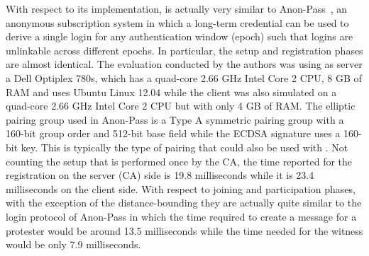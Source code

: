 With respect to its implementation, \CROCUS is actually very similar to Anon-Pass~\cite{AnonPass}, an anonymous subscription system in which a long-term credential can be used to derive a single login for any authentication window (\ie epoch) such that logins are unlinkable across different epochs. 
In particular, the setup and registration phases are almost identical. 
The evaluation conducted by the authors was using as server a Dell Optiplex 780s, which has a quad-core 2.66 GHz Intel Core 2 CPU, 8 GB of RAM and uses Ubuntu Linux 12.04 while the client was also simulated on a quad-core 2.66 GHz Intel Core 2 CPU but with only 4 GB of RAM.
The elliptic pairing group used in Anon-Pass is a Type A symmetric pairing group with a 160-bit group order and 512-bit base field while the ECDSA signature uses a 160-bit key.
This is typically the type of pairing that could also be used with \CROCUS.
Not counting the setup that is performed once by the CA, the time reported for the registration on the server (\ie CA) side is 19.8 milliseconds while it is 23.4 milliseconds on the client side.
With respect to joining and participation phases, with the exception of the distance-bounding they are actually quite similar to the login protocol of Anon-Pass in which the time required to create a message for a protester would be around 13.5 milliseconds while the time needed for the witness would be only 7.9 milliseconds.

